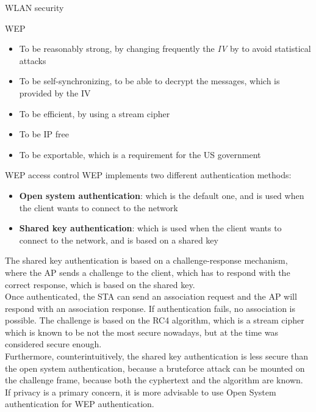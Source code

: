 \begin{section}{WLAN security}
\begin{subsection}{WEP}
    \begin{itemize}
      \item To be reasonably strong, by changing frequently the \textit{IV} by to avoid statistical attacks
      \item To be self-synchronizing, to be able to decrypt the messages, which is provided by the IV
      \item To be efficient, by using a stream cipher
      \item To be IP free
      \item To be exportable, which is a requirement for the US government
    \end{itemize}
    \begin{subsubsection}{WEP access control}
      WEP implements two different authentication methods:
      \begin{itemize}
        \item \textbf{Open system authentication}: which is the default one, and is used when the 
          client wants to connect to the network
        \item \textbf{Shared key authentication}: which is used when the client wants to connect to the 
          network, and is based on a shared key
      \end{itemize}
      The shared key authentication is based on a challenge-response mechanism, where the AP sends a
      challenge to the client, which has to respond with the correct response, which is based on the
      shared key.\\
      Once authenticated, the STA can send an association request and the AP will respond with an 
      association response. If authentication fails, no association is possible.
      The challenge is based on the RC4 algorithm, which is a stream cipher which is known to be not 
      the most secure nowadays, but at the time was considered secure enough.\\
      Furthermore, counterintuitively, the shared key authentication is less secure than the open system
      authentication, because a bruteforce attack can be mounted on the challenge frame, because both 
      the cyphertext and the algorithm are known.\\
      If privacy is a primary concern, it is more advisable to use Open System authentication for WEP
      authentication.


\end{subsubsection}
\end{subsection}
\end{section}
